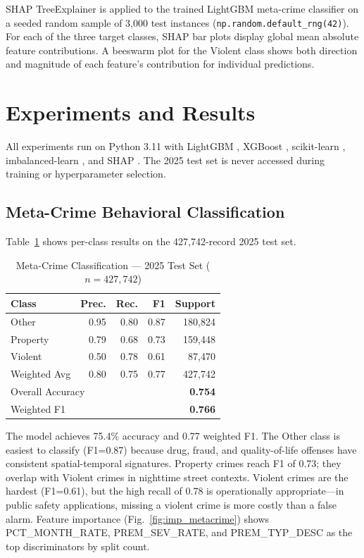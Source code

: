 \documentclass[conference]{IEEEtran}
\begin{document}
SHAP TreeExplainer \cite{lundberg2017} is applied to the trained LightGBM meta-crime classifier on a seeded random sample of 3,000 test instances (\texttt{np.random.default\_rng(42)}). For each of the three target classes, SHAP bar plots display global mean absolute feature contributions. A beeswarm plot for the Violent class shows both direction and magnitude of each feature's contribution for individual predictions.

\section{Experiments and Results}
\label{sec:results}

All experiments run on Python 3.11 with LightGBM \cite{ke2017}, XGBoost \cite{chen2016}, scikit-learn \cite{pedregosa2011}, imbalanced-learn \cite{chawla2002}, and SHAP \cite{lundberg2017}. The 2025 test set is never accessed during training or hyperparameter selection.

\subsection{Meta-Crime Behavioral Classification}

Table~\ref{tab:metacrime} shows per-class results on the 427,742-record 2025 test set.

\begin{table}[h]
\centering
\caption{Meta-Crime Classification — 2025 Test Set ($n=427{,}742$)}
\label{tab:metacrime}
\begin{tabular}{@{}lrrrr@{}}
\toprule
\textbf{Class} & \textbf{Prec.} & \textbf{Rec.} & \textbf{F1} & \textbf{Support} \\
\midrule
Other    & 0.95 & 0.80 & 0.87 & 180,824 \\
Property & 0.79 & 0.68 & 0.73 & 159,448 \\
Violent  & 0.50 & 0.78 & 0.61 &  87,470 \\
\midrule
Weighted Avg & 0.80 & 0.75 & 0.77 & 427,742 \\
\midrule
\multicolumn{4}{l}{Overall Accuracy} & \textbf{0.754} \\
\multicolumn{4}{l}{Weighted F1} & \textbf{0.766} \\
\bottomrule
\end{tabular}
\end{table}

The model achieves 75.4\% accuracy and 0.77 weighted F1. The Other class is easiest to classify (F1=0.87) because drug, fraud, and quality-of-life offenses have consistent spatial-temporal signatures. Property crimes reach F1 of 0.73; they overlap with Violent crimes in nighttime street contexts. Violent crimes are the hardest (F1=0.61), but the high recall of 0.78 is operationally appropriate—in public safety applications, missing a violent crime is more costly than a false alarm. Feature importance (Fig.~\ref{fig:imp_metacrime}) shows PCT\_MONTH\_RATE, PREM\_SEV\_RATE, and PREM\_TYP\_DESC as the top discriminators by split count.
\end{document}
